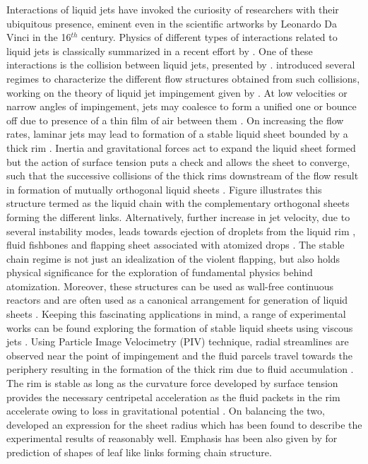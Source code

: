 \documentclass{jfm}
\begin{document}
Interactions of liquid jets have invoked the curiosity of researchers with their ubiquitous presence, eminent even in the scientific artworks by Leonardo Da Vinci in the 16$^{th}$ century. Physics of different types of interactions related to liquid jets is classically summarized in a recent effort by \cite{eggers2008physics}. One of these interactions is the collision between liquid jets, presented by \cite{rayleigh1879capillary}. \cite{bush2004collision} introduced several regimes to characterize the different flow structures obtained from such collisions, working on the theory of liquid jet impingement given by \cite{taylor1960formation}. At low velocities or narrow angles of impingement, jets may coalesce to form a unified one or bounce off due to presence of a thin film of air between them \cite{wadhwa2013noncoalescence}. On increasing the flow rates, laminar jets may lead to formation of a stable liquid sheet bounded by a thick rim \cite{yang2014liquid}. Inertia and gravitational forces act to expand the liquid sheet formed but the action of surface tension puts a check and allows the sheet  to converge, such that the successive collisions of the thick rims downstream of the flow result in formation of mutually orthogonal liquid sheets \cite{bush2004collision}. Figure illustrates this structure termed as the liquid chain with the complementary orthogonal sheets forming the different links. Alternatively, further increase in jet velocity, due to several instability modes, leads towards ejection of droplets from the liquid rim \cite{bremond2006atomization}, fluid fishbones \cite{bush2004collision} and flapping sheet \cite{villermaux2002life} associated with atomized drops \cite{ibrahim1991impinging}. The stable chain regime is not just an idealization of the violent flapping, but also holds physical significance for the exploration of fundamental physics behind atomization. Moreover, these structures can be used as wall-free continuous reactors \cite{erni2013free} and are often used as a canonical arrangement for generation of liquid sheets \cite{dombrowski1954photographic}. Keeping this fascinating applications in mind, a range of  experimental works can be found exploring the formation of stable liquid sheets using viscous jets \cite{choo2001parametric,choo2002velocity,bush2004collision,inamura2014effect}. Using Particle Image Velocimetry (PIV) technique, radial streamlines are observed near the point of impingement and the fluid parcels travel towards the periphery resulting in the formation of the thick rim due to fluid accumulation \cite{choo2002velocity,bush2004collision}. The rim is stable as long as the curvature force developed by surface tension provides the necessary centripetal acceleration as the fluid packets in the rim accelerate owing to loss in gravitational potential \cite{bremond2006atomization}. On balancing the two, \cite{taylor1960formation} developed an expression for the sheet radius which has been found to describe the experimental results of \cite{bush2004collision} reasonably well. Emphasis has been also given by \cite{bush2004collision} for prediction of shapes of leaf like links forming chain structure.  
\end{document}
